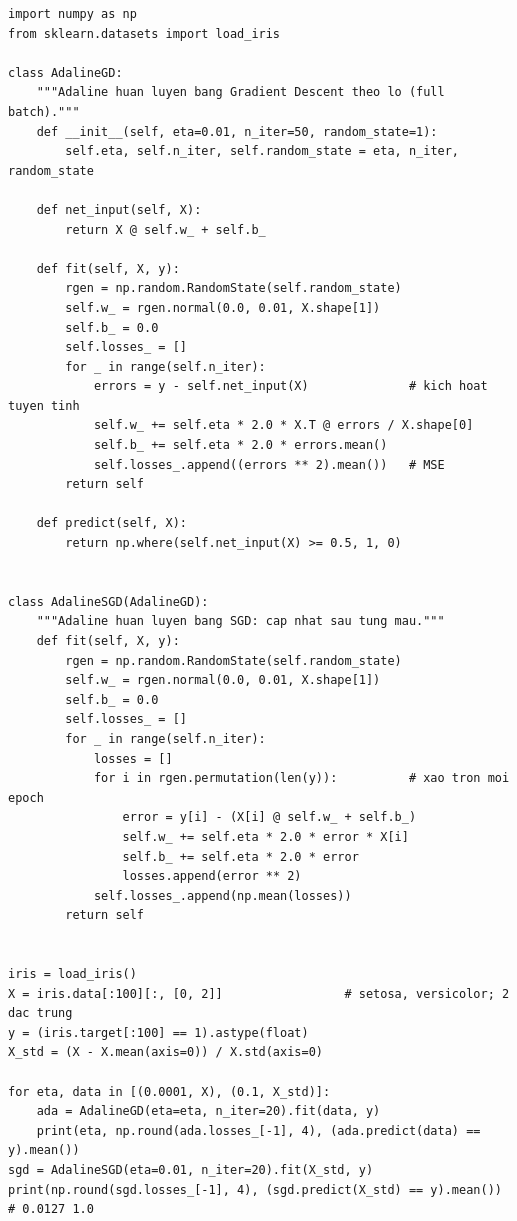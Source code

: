 \begin{lstlisting}[caption={Cài đặt Adaline theo lối hướng đối tượng: Gradient Descent và SGD}]
import numpy as np
from sklearn.datasets import load_iris

class AdalineGD:
    """Adaline huan luyen bang Gradient Descent theo lo (full batch)."""
    def __init__(self, eta=0.01, n_iter=50, random_state=1):
        self.eta, self.n_iter, self.random_state = eta, n_iter, random_state

    def net_input(self, X):
        return X @ self.w_ + self.b_

    def fit(self, X, y):
        rgen = np.random.RandomState(self.random_state)
        self.w_ = rgen.normal(0.0, 0.01, X.shape[1])
        self.b_ = 0.0
        self.losses_ = []
        for _ in range(self.n_iter):
            errors = y - self.net_input(X)              # kich hoat tuyen tinh
            self.w_ += self.eta * 2.0 * X.T @ errors / X.shape[0]
            self.b_ += self.eta * 2.0 * errors.mean()
            self.losses_.append((errors ** 2).mean())   # MSE
        return self

    def predict(self, X):
        return np.where(self.net_input(X) >= 0.5, 1, 0)


class AdalineSGD(AdalineGD):
    """Adaline huan luyen bang SGD: cap nhat sau tung mau."""
    def fit(self, X, y):
        rgen = np.random.RandomState(self.random_state)
        self.w_ = rgen.normal(0.0, 0.01, X.shape[1])
        self.b_ = 0.0
        self.losses_ = []
        for _ in range(self.n_iter):
            losses = []
            for i in rgen.permutation(len(y)):          # xao tron moi epoch
                error = y[i] - (X[i] @ self.w_ + self.b_)
                self.w_ += self.eta * 2.0 * error * X[i]
                self.b_ += self.eta * 2.0 * error
                losses.append(error ** 2)
            self.losses_.append(np.mean(losses))
        return self


iris = load_iris()
X = iris.data[:100][:, [0, 2]]                 # setosa, versicolor; 2 dac trung
y = (iris.target[:100] == 1).astype(float)
X_std = (X - X.mean(axis=0)) / X.std(axis=0)

for eta, data in [(0.0001, X), (0.1, X_std)]:
    ada = AdalineGD(eta=eta, n_iter=20).fit(data, y)
    print(eta, np.round(ada.losses_[-1], 4), (ada.predict(data) == y).mean())
sgd = AdalineSGD(eta=0.01, n_iter=20).fit(X_std, y)
print(np.round(sgd.losses_[-1], 4), (sgd.predict(X_std) == y).mean())   # 0.0127 1.0
\end{lstlisting}

